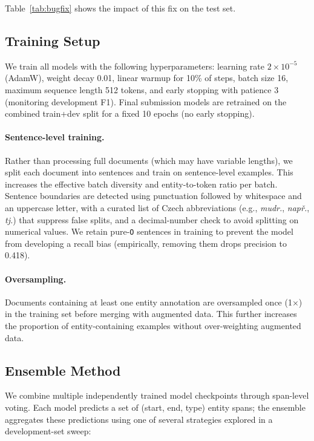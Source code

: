\documentclass[11pt]{article}
\begin{document}
Table~\ref{tab:bugfix} shows the impact of this fix on the test set.

\subsection{Training Setup}

We train all models with the following hyperparameters: learning rate $2 \times 10^{-5}$
(AdamW), weight decay 0.01, linear warmup for 10\% of steps, batch size 16, maximum
sequence length 512 tokens, and early stopping with patience 3 (monitoring development
F1). Final submission models are retrained on the combined train+dev split for a fixed
10 epochs (no early stopping).

\paragraph{Sentence-level training.}
Rather than processing full documents (which may have variable lengths), we split each
document into sentences and train on sentence-level examples. This increases the
effective batch diversity and entity-to-token ratio per batch. Sentence boundaries are
detected using punctuation followed by whitespace and an uppercase letter, with a
curated list of Czech abbreviations (e.g., \textit{mudr.}, \textit{např.}, \textit{tj.})
that suppress false splits, and a decimal-number check to avoid splitting on numerical
values. We retain pure-\texttt{O} sentences in training to prevent the model from
developing a recall bias (empirically, removing them drops precision to 0.418).

\paragraph{Oversampling.}
Documents containing at least one entity annotation are oversampled once (1$\times$) in
the training set before merging with augmented data. This further increases the proportion
of entity-containing examples without over-weighting augmented data.

\subsection{Ensemble Method}

We combine multiple independently trained model checkpoints through span-level voting.
Each model predicts a set of (start, end, type) entity spans; the ensemble aggregates
these predictions using one of several strategies explored in a development-set sweep:
\end{document}

